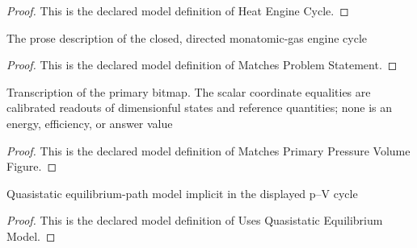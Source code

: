 \begin{proof}
  This is the declared model definition of Heat Engine Cycle.
\end{proof}
\begin{definition}
  \label{def:physics:phyx-mini-0482:phyxminiproblems-problemphyxmini0482-matchesproblemstatement}
  The prose description of the closed, directed monatomic-gas engine cycle
\end{definition}
\begin{proof}
  This is the declared model definition of Matches Problem Statement.
\end{proof}
\begin{definition}
  \label{def:physics:phyx-mini-0482:phyxminiproblems-problemphyxmini0482-matchesprimarypressurevolumefigure}
  Transcription of the primary bitmap. The scalar coordinate equalities are calibrated readouts of dimensionful states and reference quantities; none is an energy, efficiency, or answer value
\end{definition}
\begin{proof}
  This is the declared model definition of Matches Primary Pressure Volume Figure.
\end{proof}
\begin{definition}
  \label{def:physics:phyx-mini-0482:phyxminiproblems-problemphyxmini0482-usesquasistaticequilibriummodel}
  Quasistatic equilibrium-path model implicit in the displayed p--V cycle
\end{definition}
\begin{proof}
  This is the declared model definition of Uses Quasistatic Equilibrium Model.
\end{proof}
